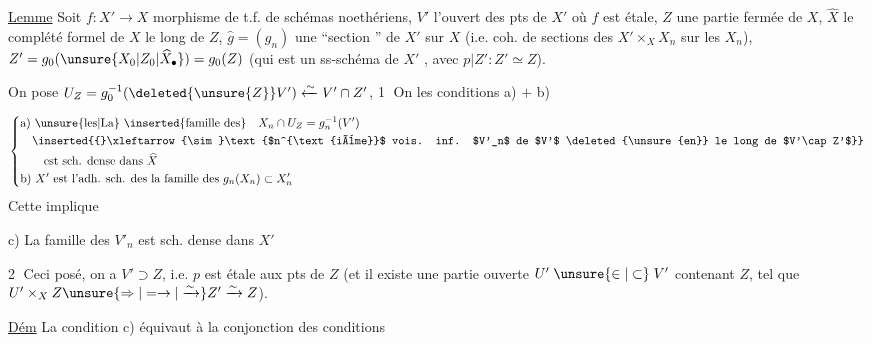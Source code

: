 \uline{Lemme} Soit $f:X'\longrightarrow X$ morphisme  de t.f.  de schémas noethériens, $V'$ l'ouvert des pts de $X'$ où $f$ est étale, $Z$ une partie fermée de $X$, $\widehat X$ le complété formel de $X$ le long de $Z$, $\widehat g=(g_n)$ une ``section '' de $X'$ sur $X$ (i.e.   coh. de sections des $X'\mathbin{\times}_X X_n$ sur les $X_n$), $Z'=g_0(\unsure{X_0|Z_0|\widehat X_\bullet})=g_0(Z)$ (qui est un ss-schéma  de $X'$ , avec $p|Z': Z'\simeq Z$).

 On pose $U_Z=g_0^{-1}(\deleted{\unsure{Z}}V')\xleftarrow{\sim}V'\cap Z'$, \textcircled{1}  On    les conditions a) $+$ b)

\[
\left\{\begin{aligned}
&\text{a) \unsure{les|La} \inserted{famille des}}\quad X_n\cap U_Z=g_n^{-1}(V')\\
&\quad\inserted{{}\xleftarrow{\sim}\text{$n^{\text{ième}}$ vois. inf. $V'_n$ de $V'$ \deleted{\unsure{en}} le long de $V'\cap Z'$}}\\
&\qquad\text{est sch. dense dans }\widehat X\\
&\text{b) }X'\text{ est l'adh. sch. des la famille des }g_n(X_n)\subset X'_n
\end{aligned}\right.
\]
Cette   implique 

c) La famille des $V'_n$  est sch. dense dans $X'$

\textcircled{2} Ceci posé,   on a $V'\supset Z$, i.e. $p$ est étale aux pts de $Z$ (et il existe  une partie ouverte $U'\mathrel{\unsure{\in|\subset}}V'$ contenant $Z$, tel que $U'\mathbin{\times}_X Z\unsure{\Rightarrow|=\rightarrow|\xrightarrow{\sim}}Z'\xrightarrow{\sim}Z$).

\uline{Dém}  La condition c) équivaut à la conjonction des conditions

